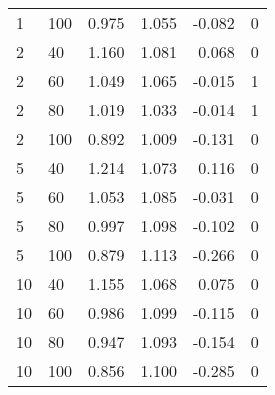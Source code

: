 \begin{table}[!htb]
\begin{tabular}{|llrrrc|}
    1     & 100   & 0.975 & 1.055 & -0.082 & 0 \\
    2     & 40    & 1.160 & 1.081 & 0.068 & 0 \\
    2     & 60    & 1.049 & 1.065 & -0.015 & 1 \\
    2     & 80    & 1.019 & 1.033 & -0.014 & 1 \\
    2     & 100   & 0.892 & 1.009 & -0.131 & 0 \\
    5     & 40    & 1.214 & 1.073 & 0.116 & 0 \\
    5     & 60    & 1.053 & 1.085 & -0.031 & 0 \\
    5     & 80    & 0.997 & 1.098 & -0.102 & 0 \\
    5     & 100   & 0.879 & 1.113 & -0.266 & 0 \\
    10    & 40    & 1.155 & 1.068 & 0.075 & 0 \\
    10    & 60    & 0.986 & 1.099 & -0.115 & 0 \\
    10    & 80    & 0.947 & 1.093 & -0.154 & 0 \\
    10    & 100   & 0.856 & 1.100 & -0.285 & 0 \\
    \hline
    \end{tabular}%
  \label{tab:limestonecheck}%
\end{table}%


